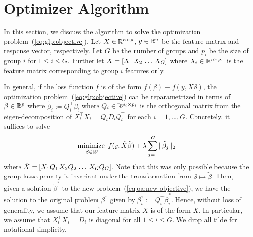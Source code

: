 \section{Optimizer Algorithm}\label{sec:optimizer}

In this section, we discuss the algorithm to solve the optimization problem~(\ref{eq:glp:objective}).
Let $X \in \mathbb{R}^{n\times p}$, $y\in \mathbb{R}^n$ be the feature matrix and response vector, respectively.
Let $G$ be the number of groups and $p_i$ be the size of group $i$ for $1\leq i\leq G$.
Further let $X = \left[X_1 \, X_2 \, \ldots \, X_G\right]$ where $X_i \in \mathbb{R}^{n \times p_i}$ is the feature matrix
corresponding to group $i$ features only.

In general, if the loss function $f$ is of the form $f(\beta) \equiv f(y, X\beta)$,
the optimization problem~(\ref{eq:glp:objective}) can be reparametrized
in terms of $\tilde{\beta} \in \mathbb{R}^p$ where $\tilde{\beta}_i := Q_i^\top \beta_i$
where $Q_i \in \mathbb{R}^{p_i \times p_i}$ is the orthogonal matrix from the eigen-decomposition of 
$X_i^\top X_i = Q_i D_i Q_i^\top$ for each $i=1,\ldots, G$.
Concretely, it suffices to solve
\begin{align}
    \operatorname*{minimize\;}_{\tilde{\beta} \in \mathbb{R}^p}
    f(y, \tilde{X} \tilde{\beta})
    + \lambda \sum\limits_{j=1}^G \|\tilde{\beta}_j\|_2
    \label{eq:oa:new-objective}
\end{align}
where $\tilde{X} = \left[X_1 Q_1 \, X_2 Q_2 \, \ldots \, X_G Q_G\right]$.
Note that this was only possible because the group lasso penalty is invariant under
the transformation from $\beta \mapsto \tilde{\beta}$.
Then, given a solution $\tilde{\beta}^*$ to the new problem~(\ref{eq:oa:new-objective}),
we have the solution to the original problem $\beta^*$ given by
$\beta^*_i := Q_i^\top \tilde{\beta}_i^*$.
Hence, without loss of generality, we assume that 
our feature matrix $X$ is of the form $\tilde{X}$.
In particular, we assume that $X_i^\top X_i = D_i$ is diagonal for all $1\leq i\leq G$.
We drop all tilde for notational simplicity.

